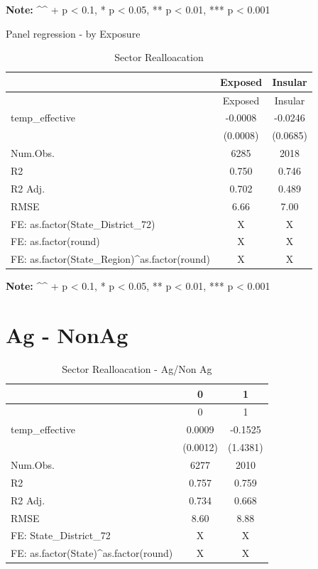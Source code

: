 \documentclass[
]{article}
\begin{document}
\textbf{Note:} \^{}\^{} + p \textless{} 0.1, * p \textless{} 0.05, ** p
\textless{} 0.01, *** p \textless{} 0.001

Panel regression - by Exposure

\begin{longtable}[]{@{}lcc@{}}
\caption{Sector Realloacation}\tabularnewline
\toprule()
& Exposed & Insular \\
\midrule()
\endfirsthead
\toprule()
& Exposed & Insular \\
\midrule()
\endhead
temp\_effective & -0.0008 & -0.0246 \\
& (0.0008) & (0.0685) \\
Num.Obs. & 6285 & 2018 \\
R2 & 0.750 & 0.746 \\
R2 Adj. & 0.702 & 0.489 \\
RMSE & 6.66 & 7.00 \\
FE: as.factor(State\_District\_72) & X & X \\
FE: as.factor(round) & X & X \\
FE: as.factor(State\_Region)\^{}as.factor(round) & X & X \\
\bottomrule()
\end{longtable}

\textbf{Note:} \^{}\^{} + p \textless{} 0.1, * p \textless{} 0.05, ** p
\textless{} 0.01, *** p \textless{} 0.001

\hypertarget{ag---nonag}{%
\section{Ag - NonAg}\label{ag---nonag}}

\tiny

\begin{longtable}[]{@{}lcc@{}}
\caption{Sector Realloacation - Ag/Non Ag}\tabularnewline
\toprule()
& 0 & 1 \\
\midrule()
\endfirsthead
\toprule()
& 0 & 1 \\
\midrule()
\endhead
temp\_effective & 0.0009 & -0.1525 \\
& (0.0012) & (1.4381) \\
Num.Obs. & 6277 & 2010 \\
R2 & 0.757 & 0.759 \\
R2 Adj. & 0.734 & 0.668 \\
RMSE & 8.60 & 8.88 \\
FE: State\_District\_72 & X & X \\
FE: as.factor(State)\^{}as.factor(round) & X & X \\
\bottomrule()
\end{longtable}
\end{document}
